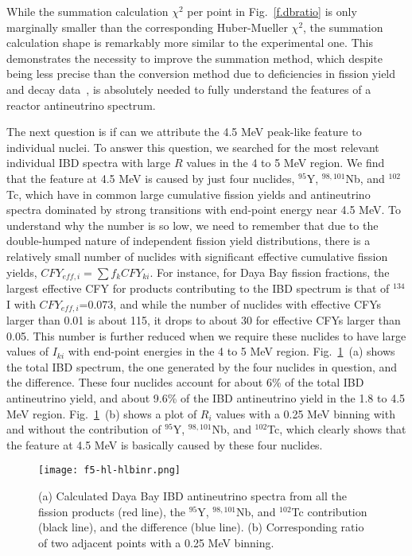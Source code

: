 \documentclass[twocolumn,amsmath,amssymb,10pt,superscriptaddress,a4paper,letterpaper,fleqn]{revtex4-1}
\begin{document}
While the summation calculation $\chi^2$ per point in Fig.~\ref{f.dbratio} is only marginally smaller than the corresponding Huber-Mueller $\chi^2$, the summation
calculation shape is remarkably more similar to the experimental one.  This
demonstrates the necessity to improve
the summation method, which
despite being less precise than the conversion method due to deficiencies in fission yield and decay data~\cite{fallot12}, is absolutely needed to
fully understand the features of a reactor antineutrino spectrum.


The next question is if can we attribute the 4.5 MeV peak-like feature to individual nuclei. To answer this question,
we searched for the most relevant individual IBD spectra with large $R$ values in the 4 to 5 MeV region.
We find that the feature at 4.5 MeV is caused by just four nuclides,
$^{95}$Y, $^{98,101}$Nb, and $^{102}$Tc, which have in common 
large cumulative fission yields and antineutrino spectra 
dominated by strong transitions with end-point energy near 4.5 MeV. 
To understand why the number is so low, we need to remember that due to the double-humped nature of
independent fission yield distributions, there is a relatively small number of nuclides with significant effective cumulative fission yields, $CFY_{eff,i}=\sum f_k CFY_{ki}$.
For instance, for Daya Bay fission fractions, the largest effective CFY for products contributing to the IBD spectrum is that of $^{134}$I with 
$CFY_{eff,i}$=0.073,
and while the number of nuclides with effective CFYs larger than
0.01 is about 115, it drops to about 30 for effective CFYs larger than 0.05.    
This number is further reduced when we require these nuclides to have large values of $I_{ki}$ with end-point energies in the 4 to 5 MeV region.
Fig.~\ref{f.hl}~(a) shows the total IBD spectrum, the one generated by the four nuclides in question,
and the difference.   
These four nuclides account for about 6\% of the total IBD antineutrino yield, and about 9.6\% of the IBD antineutrino yield in the 1.8 to 4.5 MeV region.
Fig.~\ref{f.hl}~(b) shows a plot of $R_i$ values with a 0.25 MeV binning with and without the contribution of $^{95}$Y, $^{98,101}$Nb, and $^{102}$Tc,
which clearly shows that the feature at 4.5 MeV is basically caused by these four nuclides.

\begin{figure}[t] 
\texttt{[image: f5-hl-hlbinr.png]}
\caption{
 (a) Calculated Daya Bay IBD antineutrino spectra from all the fission products (red line), the $^{95}$Y, $^{98,101}$Nb, and $^{102}$Tc contribution (black line),
and the difference (blue line).
(b) Corresponding ratio of two adjacent points with a 0.25 MeV binning.
}
\label{f.hl}
\end{figure}   
\end{document}
